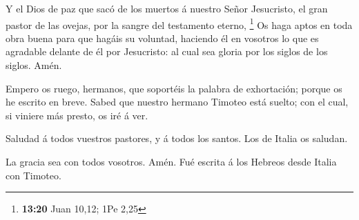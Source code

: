  Y el Dios de paz que sacó de los muertos á nuestro Señor
Jesucristo, el gran pastor de las ovejas, por la sangre del testamento
eterno, \footnote{\textbf{13:20} Juan 10,12; 1Pe 2,25}  Os
haga aptos en toda obra buena para que hagáis su voluntad, haciendo él
en vosotros lo que es agradable delante de él por Jesucristo: al cual
sea gloria por los siglos de los siglos. Amén.

 Empero os ruego, hermanos, que soportéis la palabra de
exhortación; porque os he escrito en breve.  Sabed que
nuestro hermano Timoteo está suelto; con el cual, si viniere más presto,
os iré á ver.

 Saludad á todos vuestros pastores, y á todos los santos.
Los de Italia os saludan.

 La gracia sea con todos vosotros. Amén. Fué escrita á los
Hebreos desde Italia con Timoteo.
